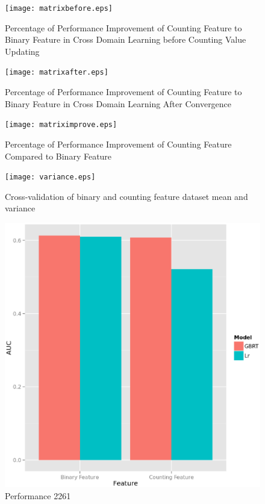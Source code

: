 \documentclass{sig-alternate}
\begin{document}
\begin{figure}[t]
\centering
\texttt{[image: matrixbefore.eps]}
\caption{Percentage of Performance Improvement of Counting Feature to Binary Feature in Cross Domain Learning before Counting Value Updating}
\label{fig:matrixbefore}
\end{figure}

\begin{figure}[t]
\centering
\texttt{[image: matrixafter.eps]}
\caption{Percentage of Performance Improvement of Counting Feature to Binary Feature in Cross Domain Learning After Convergence}
\label{fig:matrixafter}
\end{figure}

\begin{figure}[t]
\centering
\texttt{[image: matriximprove.eps]}
\caption{Percentage of Performance Improvement of Counting Feature Compared to Binary Feature}
\label{fig:matriximprove}
\end{figure}


\begin{figure}[t]
\centering
\texttt{[image: variance.eps]}
\caption{Cross-validation of binary and counting feature dataset mean and variance}
\label{fig:variance}
\end{figure}

\begin{figure}[t]
\centering
\includegraphics[width=\columnwidth]{2261.eps}
\caption{Performance 2261}
\label{fig:2261}
\end{figure}
\end{document}
